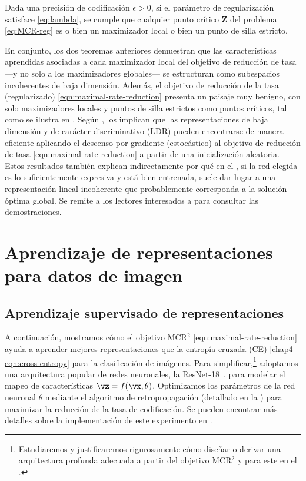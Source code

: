 \documentclass[../../book-main.tex]{subfiles}
\begin{document}
\begin{theorem}
\label{thm:mcr-benign-opt-landscape}
    Dada una precisión de codificación $\epsilon > 0$, si el parámetro de regularización
    satisface \eqref{eq:lambda},
    se cumple que cualquier punto crítico $\bm Z$ del problema
    \eqref{eq:MCR-reg} es o bien un maximizador local o bien un punto de silla estricto.
\end{theorem}
En conjunto, los dos teoremas anteriores 
demuestran que las características aprendidas asociadas a cada
maximizador local del objetivo de
reducción de tasa ---y no solo a los maximizadores globales--- se estructuran
como subespacios incoherentes de baja dimensión. Además, el
objetivo de reducción de la tasa (regularizado)
\eqref{eqn:maximal-rate-reduction} presenta un paisaje muy benigno, con
solo maximizadores locales y puntos de silla estrictos como puntos críticos, tal como
se ilustra en .
Según \cite{sun2015nonconvex,lee2016gradient}, los
 implican que
las representaciones de baja dimensión y de carácter discriminativo (LDR) pueden
encontrarse de manera eficiente aplicando el descenso por gradiente (estocástico) al
objetivo de reducción de tasa \eqref{eqn:maximal-rate-reduction} a partir de 
una inicialización aleatoria. Estos resultados también explican indirectamente por qué en el
, si la red elegida es lo suficientemente expresiva
y está bien entrenada, suele dar lugar a
una representación lineal incoherente que probablemente corresponda a la
solución óptima global. Se remite a los lectores interesados a 
\cite{wang2024global} para consultar las demostraciones.

\section{Aprendizaje de representaciones para datos de imagen}
\label{sec:representations-image}
\subsection{Aprendizaje supervisado de representaciones}
\label{sec:MCR2-classification}
\label{eg:Rate-Reduction-CIFAR10}

A continuación, mostramos cómo el objetivo MCR$^2$
\eqref{eqn:maximal-rate-reduction} ayuda a aprender mejores representaciones
que la entropía cruzada (CE) \eqref{chap4-eqn:cross-entropy} para la clasificación
de imágenes. Para simplificar,\footnote{Estudiaremos y justificaremos rigurosamente
    cómo diseñar o derivar una arquitectura profunda adecuada
a partir del objetivo MCR$^2$ y para este en el .}
adoptamos una arquitectura popular de redes neuronales, la
ResNet-18~\cite{he2016deep}, para modelar el mapeo de características $\vz =
f(\vx,\theta)$. Optimizamos los parámetros de la red neuronal $\theta$ mediante
el algoritmo de retropropagación (detallado en la
) para maximizar la reducción de la tasa de codificación. Se pueden encontrar más
detalles sobre la implementación de este experimento en
\cite{chan2021redunet}.
\end{document}
